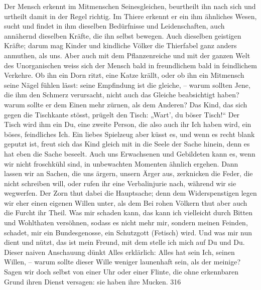 \largerpage[1]Der Mensch erkennt im Mitmenschen Seinesgleichen, beurtheilt ihn nach sich und urtheilt damit in der Regel richtig. Im Thiere erkennt er ein ihm ähnliches Wesen, sucht und findet in ihm dieselben Bedürfnisse und Leidenschaften, auch annähernd dieselben Kräfte, die ihn selbst bewegen. Auch dieselben geistigen Kräfte; darum mag Kinder und kindliche Völker die Thierfabel ganz anders anmuthen, als uns. Aber auch mit dem Pflanzenreiche und mit der ganzen Welt des Unorganischen weiss sich der Mensch bald in freundlichem bald in feindlichem Verkehre. Ob ihn ein Dorn ritzt, eine Katze krällt, oder ob ihn ein Mitmensch seine Nägel fühlen lässt: seine Empfindung ist die gleiche, – warum sollten Jene, die ihm den Schmerz verursacht, nicht auch das Gleiche beabsichtigt haben? warum sollte er dem Einen mehr zürnen, \label{fp.306} als dem Anderen? Das Kind, das sich gegen die Tischkante stösst, prügelt den Tisch: „Wart’, du böser Tisch!“ Der Tisch wird ihm ein Du, eine zweite Person, die also auch ihr Ich haben wird, ein böses, feindliches Ich. Ein liebes Spielzeug aber küsst es, und wenn es recht blank geputzt ist, freut sich das Kind gleich mit in die Seele der Sache hinein, denn es hat eben die Sache beseelt. Auch uns Erwachsenen und Gebildeten kann es, wenn wir nicht froschkühl sind, in unbewachten Momenten ähnlich ergehen. Dann lassen wir an Sachen, die uns ärgern, unsern Ärger aus, zerknicken die Feder, die nicht schreiben will, oder rufen ihr eine Verbalinjurie nach, während wir sie wegwerfen. Der Zorn thut dabei die Hauptsache; denn dem Widerspenstigen legen wir eher einen eigenen Willen unter, als dem  Bei rohen Völkern thut aber auch die Furcht ihr Theil. Was mir schaden kann, das kann ich vielleicht durch Bitten und Wohlthaten versöhnen, sodass es nicht mehr mir, sondern meinen Feinden, schadet, mir ein Bundesgenosse, ein Schutzgott (Fetisch) wird. Und was mir nun dient und nützt, das ist mein Freund, mit dem stelle ich mich auf Du und Du. Dieser naiven Anschauung dünkt Alles erklärlich: Alles hat sein Ich, seinen Willen, – warum sollte dieser Wille weniger launenhaft sein, als der meinige? Sagen wir doch selbst von einer Uhr oder einer Flinte, die ohne erkennbaren Grund ihren Dienst versagen: sie haben ihre Mucken.  {\textbar}{\textbar}316{\textbar}{\textbar}\label{sp.316} 

